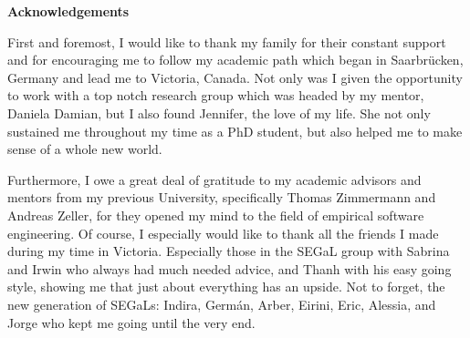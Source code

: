 \newpage
{}

\begin{center}
\textbf{Acknowledgements}
\end{center}

First and foremost, I would like to thank my family for their constant support and for encouraging me to follow my academic path which began in Saarbr{\"u}cken, Germany and lead me to Victoria, Canada.
%
Not only was I given the opportunity to work with a top notch research group which was headed by my mentor, Daniela Damian, but I also found Jennifer, the love of my life. She not only sustained me throughout my time as a PhD student, but also helped me to make sense of a whole new world.

Furthermore, I owe a great deal of gratitude to my academic advisors and mentors from my previous University, specifically Thomas Zimmermann and Andreas Zeller, for they opened my mind to the field of empirical software engineering.
%
Of course, I especially would like to thank all the friends I made during my time in Victoria. Especially those in the SEGaL group with Sabrina and Irwin who always had much needed advice, and Thanh with his easy going style, showing me that just about everything has an upside.
Not to forget, the new generation of SEGaLs: Indira, Germ{\'a}n, Arber, Eirini, Eric, Alessia, and Jorge who kept me going until the very end.





